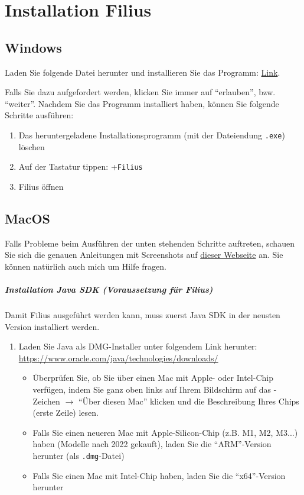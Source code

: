 \chapter{Installation Filius}
\label{subsec:filius-installation}
\section{Windows}
Laden Sie folgende Datei herunter und installieren Sie das Programm:  \href{https://www.lernsoftware-filius.de/Herunterladen}{Link}.

Falls Sie dazu aufgefordert werden, klicken Sie immer auf \enquote{erlauben}, bzw. \enquote{weiter}. Nachdem Sie das Programm installiert haben, können Sie folgende Schritte ausführen:
\begin{enumerate}
	\item Das heruntergeladene Installationsprogramm (mit der Dateiendung \texttt{.exe}) löschen
	\item Auf der Tastatur tippen: \faWindows+\texttt{Filius}
	\item Filius öffnen
\end{enumerate}
\section{MacOS}
\begin{mycaution}
	Falls Probleme beim Ausführen der unten stehenden Schritte auftreten, schauen Sie sich die genauen Anleitungen mit Screenshots auf \href{https://oinf.ch/wp-content/uploads/Anleitung_Filius_Mac-OS.pdf}{dieser Webseite} an. Sie können natürlich auch mich um Hilfe fragen.
\end{mycaution}
\paragraph*{Installation Java SDK (Voraussetzung für Filius)}
Damit Filius ausgeführt werden kann, muss zuerst Java SDK in der neusten Version installiert werden.
\begin{enumerate}
	\item Laden Sie Java als DMG-Installer unter folgendem Link herunter: \url{https://www.oracle.com/java/technologies/downloads/}
	      \begin{itemize}
		      \item Überprüfen Sie, ob Sie über einen Mac mit Apple- oder Intel-Chip verfügen, indem Sie ganz oben links auf Ihrem Bildschirm auf das \faApple{}-Zeichen $\rightarrow$ \enquote{Über diesen Mac} klicken und die Beschreibung Ihres Chips (erste Zeile) lesen.
		      \item Falls Sie einen neueren Mac mit Apple-Silicon-Chip (z.B. M1, M2, M3...) haben (Modelle nach 2022 gekauft), laden Sie die \enquote{ARM}-Version herunter (als \texttt{.dmg}-Datei)
		      \item Falls Sie einen Mac mit Intel-Chip haben, laden Sie die \enquote{x64}-Version herunter
	      \end{itemize}
\end{enumerate}

